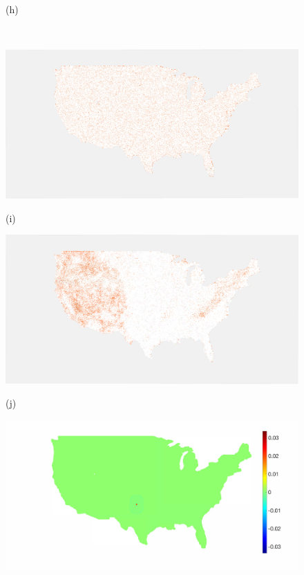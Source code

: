 \documentclass[journal, 10pt]{IEEEtran}
\begin{document}
\begin{figure}[tb]
\begin{minipage}[m]{0.24\linewidth}
\centerline{\small{(h)}}
\end{minipage} \medskip  \\
\begin{minipage}[m]{0.24\linewidth}
\centerline{\includegraphics[width=.94\linewidth]{fig_temp_selected_b2}}
\centerline{\small{(i)}}
\end{minipage}%
\begin{minipage}[m]{0.24\linewidth}
\centerline{\includegraphics[width=.94\linewidth]{fig_temp_selected_b2_adapted}}
\centerline{\small{(j)}}
\end{minipage}
\begin{minipage}[m]{0.24\linewidth}
\centerline{\includegraphics[width=1\linewidth]{fig_temp_scaling}}

\end{minipage}
\end{figure}
\end{document}
